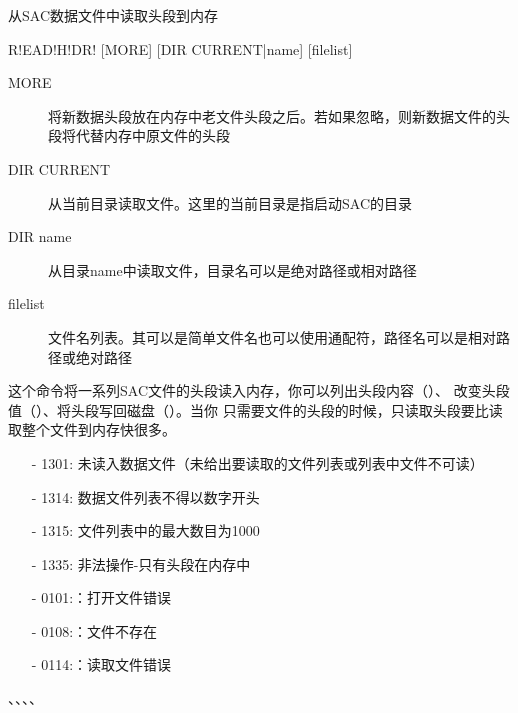 \label{cmd:readhdr}

从SAC数据文件中读取头段到内存

\begin{SACSTX}
R!EAD!H!DR! [MORE] [DIR CURRENT|name] [filelist]
\end{SACSTX}

\begin{description}
\item [MORE] 将新数据头段放在内存中老文件头段之后。若如果忽略，则新数据文件的头段将代替内存中原文件的头段
\item [DIR CURRENT] 从当前目录读取文件。这里的当前目录是指启动SAC的目录
\item [DIR name] 从目录name中读取文件，目录名可以是绝对路径或相对路径 
\item [filelist] 文件名列表。其可以是简单文件名也可以使用通配符，路径名可以是相对路径或绝对路径
\end{description}

这个命令将一系列SAC文件的头段读入内存，你可以列出头段内容（）、
改变头段值（）、将头段写回磁盘（）。当你
只需要文件的头段的时候，只读取头段要比读取整个文件到内存快很多。

\begin{itemize}
\item[-]1301: 未读入数据文件（未给出要读取的文件列表或列表中文件不可读）
\item[-]1314: 数据文件列表不得以数字开头
\item[-]1315: 文件列表中的最大数目为1000
\item[-]1335: 非法操作-只有头段在内存中
\end{itemize}

\begin{itemize}
\item[-]0101:：打开文件错误
\item[-]0108:：文件不存在
\item[-]0114:：读取文件错误
\end{itemize}

、、、、
